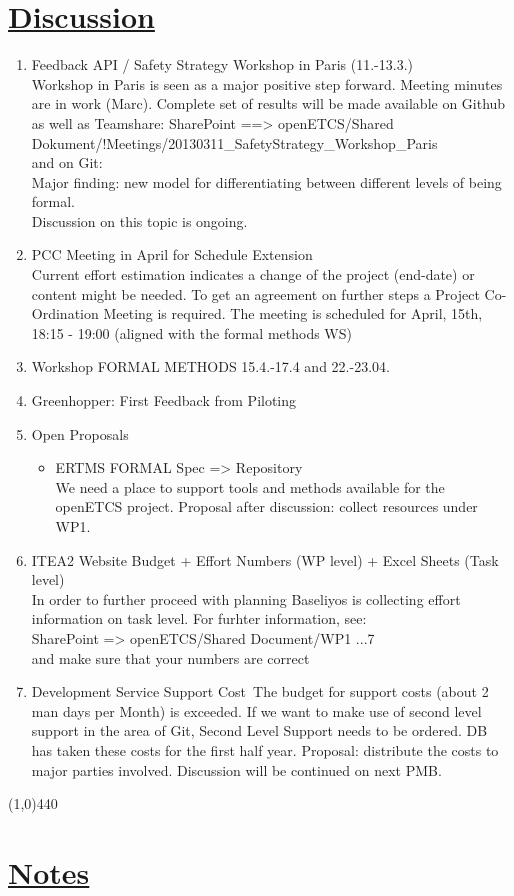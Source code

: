 \documentclass[a4paper]{article}
\begin{document}
\section*{\underline{Discussion}}

\begin{enumerate}
\item Feedback API / Safety Strategy Workshop in Paris (11.-13.3.)\\
Workshop in Paris is seen as a major positive step forward. Meeting minutes are in work (Marc). Complete set of results will be made available on Github as well as Teamshare:\newline
SharePoint ==> openETCS/Shared Dokument/!Meetings/20130311\_SafetyStrategy\_Workshop\_Paris\\
and on Git:\\
Major finding: new model for differentiating between different levels of being formal.\\
Discussion on this topic is ongoing.
\item PCC Meeting in April for Schedule Extension\\
Current effort estimation indicates a change of the project (end-date) or content might be needed. To get an agreement on further steps a Project Co-Ordination Meeting is required. The meeting is scheduled for April, 15th, 18:15 - 19:00 (aligned with the formal methods WS)

\item Workshop FORMAL METHODS 15.4.-17.4 and 22.-23.04.
\item Greenhopper:  First Feedback from Piloting
\item Open Proposals
\begin{itemize}
\item ERTMS FORMAL Spec  => Repository\\
We need a place to support tools and methods available for the openETCS project. Proposal after discussion: collect resources under WP1.\\
\end{itemize}
\item ITEA2 Website Budget + Effort Numbers (WP level) + Excel Sheets (Task
level)\\
In order to further proceed with planning Baseliyos is collecting effort information on task level. For furhter information, see:\\
SharePoint => openETCS/Shared Document/WP1 ...7\\
and make sure that your numbers are correct

\item Development Service Support Cost\
The budget for support costs (about 2 man days per Month) is exceeded. If we want to make use of second level support in the area of Git, Second Level Support needs to be ordered. DB has taken these costs for the first half year. Proposal: distribute the costs to major parties involved. Discussion will be continued on next PMB.

\end{enumerate}

\line(1,0){440}
\section*{\underline{Notes}}
\end{document}
